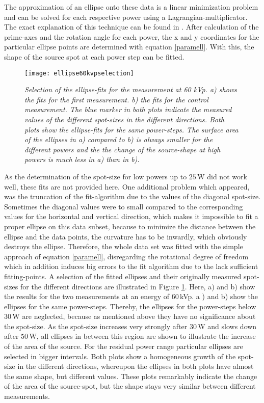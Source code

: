 The approximation of an ellipse onto these data is a linear minimization problem and can be solved for each respective power using a Lagrangian-multiplicator. The exact explanation of this technique can be found in \citep{Honerkamp1993}. After calculation of the prime-axes and the rotation angle for each power, the x and y coordinates for the particular ellipse points are determined with equation \ref{paramell}. With this, the shape of the source spot at each power step can be fitted. 
\begin{figure}[h]
	\begin{center}
		\texttt{[image: ellipse60kvpselection]}
	\end{center}
	\caption[Selection of ellipse-fits for an energy of 60kVp]{\textit{Selection of the ellipse-fits for the measurement at 60 kVp. a) shows the fits for the first measurement. b) the fits for the control measurement. The blue marker in both plots indicate the measured values of the different spot-sizes in the different directions. Both plots show the ellipse-fits for the same power-steps. The surface area of the ellipses in a) compared to b) is always smaller for the different powers and the the change of the source-shape at high powers is much less in a) than in b).}}
	\label{ell60kvpselec}
\end{figure}
As the determination of the spot-size for low powers up to $25\,$W did not work well, these fits are not provided here. One additional problem which appeared, was the truncation of the fit-algorithm due to the values of the diagonal spot-size. Sometimes the diagonal values were to small compared to the corresponding values for the horizontal and vertical direction, which makes it impossible to fit a proper ellipse on this data subset, because to minimize the distance between the ellipse and the data points, the curvature has to be inwardly, which obviously destroys the ellipse. Therefore, the whole data set was fitted with the simple approach of equation \ref{paramell}, disregarding the rotational degree of freedom which in addition induces big errors to the fit algorithm due to the lack sufficient fitting-points. A selection of the fitted ellipses and their originally measured spot-sizes for the different directions are illustrated in Figure \ref{ell60kvpselec}. Here, a) and b) show the results for the two measurements at an energy of $60\,$kVp. a ) and b) show the ellipses for the same power-steps. Thereby, the ellipses for the power-steps below $30\,$W are neglected, because as mentioned above they have no significance about the spot-size. As the spot-size increases very strongly after $30\,$W and slows down after $50\,$W, all ellipses in between this region are shown to illustrate the increase of the area of the source. For the residual power range particular ellipses are selected in bigger intervals. Both plots show a homogeneous growth of the spot-size in the different directions, whereupon the ellipses in both plots have almost the same shape, but different values. These plots remarkably indicate the change of the area of the source-spot, but the shape stays very similar between different measurements.
